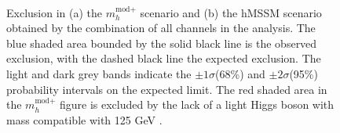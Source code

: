 \begin{figure}[h!]
\begin{center}
~\\
\end{center}
\caption{Exclusion in (a) the $m_{h}^{\text{mod}+}$ scenario and (b) the hMSSM scenario 
obtained by the combination
of all channels in the \AHtotautau analysis. The blue shaded area bounded by the 
solid black line is the observed exclusion, with the dashed black line the
expected exclusion. The light and dark grey bands indicate
the $\pm 1\sigma$(68\%) and $\pm 2\sigma$(95\%) probability intervals on the expected limit.
The red shaded area in the $m_{h}^{\text{mod}+}$ figure
is excluded by the lack of a light Higgs boson with mass compatible with 125 GeV \cite{CMS-PAS-HIG-16-037}.}
\label{fig:mssm_mhmodp_2016}
\end{figure}

